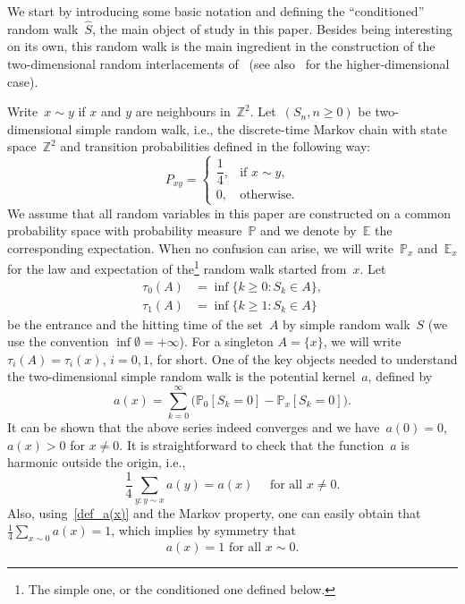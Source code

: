 \documentclass[11pt]{article}
\theoremstyle{definition}
\numberwithin{equation}{section}
\numberwithin{figure}{section}
\numberwithin{table}{section}
\newcommand{\1}[1]{{\mathbf 1}{\{#1\}}}
\newcommand{\Z}{\mathbb{Z}}
\newcommand{\s}{{\widehat S}}
\newcommand{\8}{{\infty}}
\newcommand{\IP}{{\mathbb P}}
\newcommand{\IE}{{\mathbb E}}
\begin{document}
We start by introducing some basic notation and defining the ``conditioned'' random walk~$\s$, the main object of study in this paper. Besides being interesting on its own, this random walk is the main ingredient in the construction of the two-dimensional random interlacements of~\cite{CP16,CPV16} (see also~\cite{CT12,DRS14,SLT,Szn10} for the higher-dimensional case).

Write~$x\sim y$ if $x$ and $y$ are neighbours in~$\Z^2$. Let~$(S_n, n\geq 0)$ be two-dimensional simple random walk, i.e., the discrete-time Markov chain with state space~$\Z^2$ and transition probabilities defined in the following way:
\begin{equation}\label{def_S}
P_{xy} =
\begin{cases}
\dfrac{1}{4}, & \text{if }x\sim y,\\[0.6em]
0, & \text{otherwise}.
\end{cases}
\end{equation}
We assume that all random variables in this paper are constructed on a common probability space with probability measure~$\IP$ and we denote by~$\IE$ the corresponding expectation. When no confusion can arise, we will write~$\IP_x$ and~$\IE_x$ for the law and expectation of the\footnote{The simple one, or the conditioned one defined below.} random walk started from~$x$. Let
\begin{align}
\tau_0(A) &= \inf\{k\geq 0: S_k\in A\} \label{entrance_t},\\
\tau_1(A) &= \inf\{k\geq 1: S_k\in A\} \label{hitting_t}
\end{align}
be the entrance and the hitting time of the set~$A$ by simple random walk~$S$ (we use the convention $\inf \emptyset = +\8$). For a singleton $A=\{x\}$, we will write $\tau_i(A)=\tau_i(x)$, $i=0,1$, for short. One of the key objects needed to understand the two-dimensional simple random walk is the potential kernel~$a$, defined by
\begin{equation}\label{def_a(x)}
a(x) = \sum_{k=0}^\infty\big(\IP_0[S_k\!=\!0]-\IP_x[S_k\!=\!0]\big).
\end{equation}
It can be shown that the above series indeed converges and we have~$a(0)=0$, $a(x)>0$ for $x\neq 0$. It is straightforward to check that the function~$a$ is harmonic outside the origin, i.e.,
\begin{equation}\label{a_harm}
\frac{1}{4}\sum_{y: y\sim x}a(y) = a(x) \quad \text{ for all } x\neq 0.
\end{equation}
Also, using~\eqref{def_a(x)} and the Markov property, one can easily obtain that $\frac{1}{4}\sum_{x\sim 0}a(x)=1$, which implies by symmetry that
\begin{equation}\label{a(x)=1}
a(x)=1 \text{ for all }x\sim 0.
\end{equation}
\end{document}
